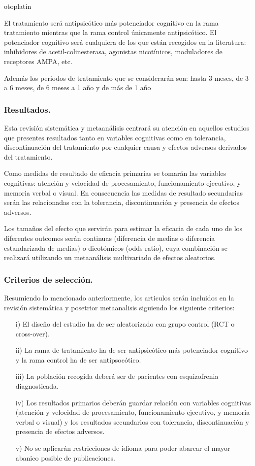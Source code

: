 otoplatin\documentclass[a4paper,openright,12pt]{report}
\begin{document}
El tratamiento será antipsicótico más potenciador cognitivo en la rama tratamiento mientras que la rama control únicamente antipsicótico. El potenciador cognitivo será cualquiera de los que están recogidos en la literatura: inhibidores de acetil-colinesterasa, agonistas nicotínicos, moduladores de receptores AMPA, etc. 

Además los periodos de tratamiento que se considerarán son: hasta 3 meses, de 3 a 6 meses, de 6 meses a 1 año y de más de 1 año

\subsubsection{Resultados.}

Esta revisión sistemática y metaanálisis centrará su atención en aquellos estudios que presentes resultados tanto en variables cognitivas como en tolerancia, discontinuación del tratamiento por cualquier causa y efectos adversos derivados del tratamiento.

Como medidas de resultado de eficacia primarias se tomarán las variables cognitivas: atención y velocidad de procesamiento, funcionamiento ejecutivo, y memoria verbal o visual. En consecuencia las medidas de resultado secundarias serán las relacionadas con la tolerancia, discontinuación y presencia de efectos adversos.

Los tamaños del efecto que servirán para estimar la eficacia de cada uno de los diferentes outcomes serán continuas (diferencia de medias o diferencia estandarizada de medias) o dicotómicos (odds ratio), cuya combinación se realizará utilizando un metaanálisis multivariado de efectos aleatorios.

\subsubsection{Criterios de selección.}

Resumiendo lo mencionado anteriormente, los articulos serán incluidos en la revisión sistemática y posetrior metaanalisis siguiendo los siguiente criterios:
\begin{itemize}
\item[i)] El diseño del estudio ha de ser aleatorizado con grupo control (RCT o cross-over).
\item[ii)] La rama de tratamiento ha de ser antipsicótico más potenciador cognitivo y la rama control ha de ser antipsocótico.
\item[iii)] La población recogida deberá ser de pacientes con esquizofrenia diagnosticada.
\item[iv)] Los resultados primarios deberán guardar relación con variables cognitivas (atención y velocidad de procesamiento, funcionamiento ejecutivo, y memoria verbal o visual) y los resultados secundarios con tolerancia, discontinuación y presencia de efectos adversos.
\item[v)] No se aplicarán restricciones de idioma para poder abarcar el mayor abanico posible de publicaciones.
\end{itemize}
\end{document}
